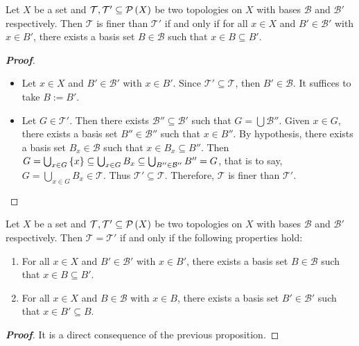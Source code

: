\begin{proposition}
  Let $X$ be a set and $\mathcal{T},\mathcal{T}'\subseteq\mathcal{P}\left(X\right)$ be two topologies on $X$ with bases $\mathcal{B}$ and $\mathcal{B}'$ respectively. Then $\mathcal{T}$ is finer than $\mathcal{T}'$ if and only if for all $x\in X$ and $B'\in\mathcal{B}'$ with $x\in B'$, there exists a basis set $B\in\mathcal{B}$ such that $x\in B\subseteq B'$.

  \begin{proof}[\rm\textbf{Proof}]
    \hfill
    \begin{itemize}
        \item[\boxed{\Rightarrow}] Let $x\in X$ and $B'\in\mathcal{B}'$ with $x\in B'$. Since $\mathcal{T}'\subseteq\mathcal{T}$, then $B'\in\mathcal{B}$. It suffices to take $B:=B'$.
        \item[\boxed{\Leftarrow}] Let $G\in\mathcal{T}'$. Then there exists $\mathcal{B}''\subseteq\mathcal{B'}$ such that $G=\bigcup{\mathcal{B}''}$. Given $x\in G$, there exists a basis set $B''\in\mathcal{B}''$ such that $x\in B''$. By hypothesis, there exists a basis set $B_x\in\mathcal{B}$ such that $x\in B_x\subseteq B''$. Then $G=\bigcup_{x\in G}{\left\{x\right\}}\subseteq\bigcup_{x\in G}{B_x}\subseteq\bigcup_{B''\in\mathcal{B}''}{B''}=G$, that is to say, $G=\bigcup_{x\in G}{B_x}\in\mathcal{T}$. Thus $\mathcal{T}'\subseteq\mathcal{T}$. Therefore, $\mathcal{T}$ is finer than $\mathcal{T}'$.
    \end{itemize}
  \end{proof}
\end{proposition}

\begin{corollary}
  Let $X$ be a set and $\mathcal{T},\mathcal{T}'\subseteq\mathcal{P}\left(X\right)$ be two topologies on $X$ with bases $\mathcal{B}$ and $\mathcal{B}'$ respectively. Then $\mathcal{T}=\mathcal{T}'$ if and only if the following properties hold:

  \begin{enumerate}
      \item For all $x\in X$ and $B'\in\mathcal{B}'$ with $x\in B'$, there exists a basis set $B\in\mathcal{B}$ such that $x\in B\subseteq B'$.
      \item For all $x\in X$ and $B\in\mathcal{B}$ with $x\in B$, there exists a basis set $B'\in\mathcal{B}'$ such that $x\in B'\subseteq B$.
  \end{enumerate}
  \begin{proof}[\rm\textbf{Proof}]
    It is a direct consequence of the previous proposition.
  \end{proof}
\end{corollary}


